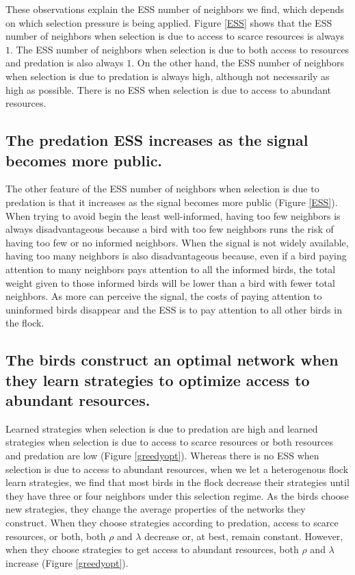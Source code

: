\documentclass{article}
\begin{document}
These observations explain the ESS number of neighbors we find, which depends on which selection pressure is being applied. Figure \ref{ESS} shows that the ESS number of neighbors when selection is due to access to scarce resources is always $1$. The ESS number of neighbors when selection is due to both access to resources and predation is also always $1$. On the other hand, the ESS number of neighbors when selection is due to predation is always high, although not necessarily as high as possible. There is no ESS when selection is due to access to abundant resources.

\subsection{The predation ESS increases as the signal becomes more public.}
The other feature of the ESS number of neighbors when selection is due to predation is that it increases as the signal becomes more public (Figure \ref{ESS}).  When trying to avoid begin the least well-informed, having too few neighbors is always disadvantageous because a bird with too few neighbors runs the risk of having too few or no informed neighbors.  When the signal is not widely available, having too many neighbors is also disadvantageous because, even if a bird paying attention to many neighbors pays attention to all the informed birds, the total weight given to those informed birds will be lower than a bird with fewer total neighbors. As more can perceive the signal, the costs of paying attention to uninformed birds disappear and the ESS is to pay attention to all other birds in the flock. 

\subsection{The birds construct an optimal network when they learn strategies to optimize access to abundant resources. }
Learned strategies when selection is due to predation are high and learned strategies when selection is due to access to scarce resources or both resources and predation are low (Figure \ref{greedyopt}). Whereas there is no ESS when selection is due to access to abundant resources, when we let a heterogenous flock learn strategies, we find that most birds in the flock decrease their strategies until they have three or four neighbors under this selection regime.  As the birds choose new strategies, they change the average properties of the networks they construct. When they choose strategies according to predation, access to scarce resources, or both, both $\rho$ and $\lambda$ decrease or, at best, remain constant. However, when they choose strategies to get access to abundant resources, both $\rho$ and $\lambda$ increase (Figure \ref{greedyopt}). 
\end{document}
